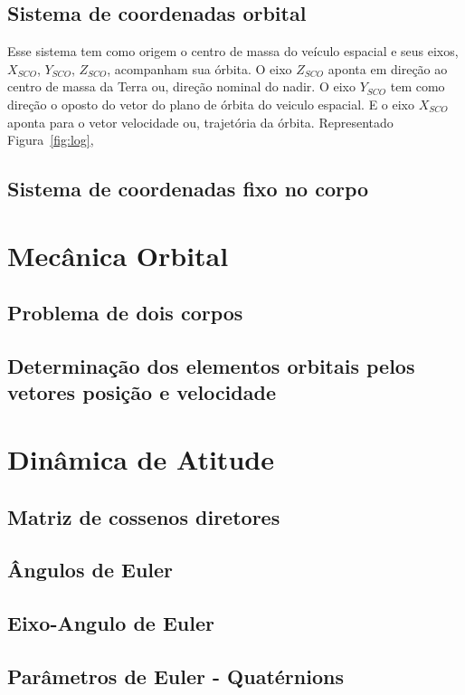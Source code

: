 \subsection{Sistema de coordenadas orbital}

Esse sistema tem como origem o centro de massa do veículo espacial e seus eixos, $X_{SCO}$, $Y_{SCO}$, $Z_{SCO}$, acompanham sua órbita. O eixo $Z_{SCO}$ aponta em direção ao centro de massa da Terra ou, direção nominal do nadir. O eixo $Y_{SCO}$ tem como direção o oposto do vetor do plano de órbita do veiculo espacial. E o eixo $X_{SCO}$ aponta para o vetor velocidade ou, trajetória da órbita. Representado Figura~\ref{fig:log},

\subsection{Sistema de coordenadas fixo no corpo}

\section{Mecânica Orbital}
\subsection{Problema de dois corpos}
\subsection{Determinação dos elementos orbitais pelos vetores posição e velocidade}

\section{Dinâmica de Atitude}
\subsection{Matriz de cossenos diretores}
\subsection{Ângulos de Euler}
\subsection{Eixo-Angulo de Euler}
\subsection{Parâmetros de Euler - Quatérnions}
